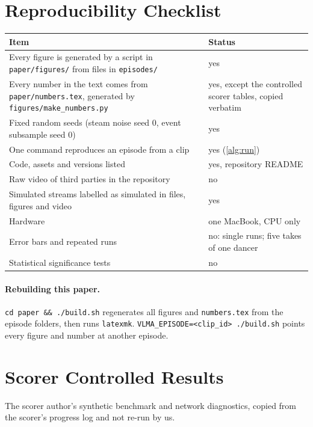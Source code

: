 \documentclass[10pt]{article}
\newcommand{\file}[1]{\texttt{#1}}
\begin{document}
\clearpage
\appendix
\section{Reproducibility Checklist}
\label{app:repro}

\begin{small}
\begin{tabularx}{\linewidth}{@{}>{\raggedright\arraybackslash}X >{\raggedright\arraybackslash}p{5.2cm}@{}}
\toprule
Item & Status \\
\midrule
Every figure is generated by a script in \file{paper/figures/} from files in \file{episodes/} & yes \\
Every number in the text comes from \file{paper/numbers.tex}, generated by \file{figures/make\_numbers.py} & yes, except the controlled scorer tables, copied verbatim \\
Fixed random seeds (steam noise seed 0, event subsample seed 0) & yes \\
One command reproduces an episode from a clip & yes (\cref{alg:run}) \\
Code, assets and versions listed & yes, repository README \\
Raw video of third parties in the repository & no \\
Simulated streams labelled as simulated in files, figures and video & yes \\
Hardware & one MacBook, CPU only \\
Error bars and repeated runs & no: single runs; five takes of one dancer \\
Statistical significance tests & no \\
\bottomrule
\end{tabularx}
\end{small}

\paragraph{Rebuilding this paper.} \texttt{cd paper \&\& ./build.sh} regenerates all figures and \file{numbers.tex} from the episode folders, then runs \texttt{latexmk}. \texttt{VLMA\_EPISODE=<clip\_id> ./build.sh} points every figure and number at another episode.

\section{Scorer Controlled Results}
\label{app:scorer}

The scorer author's synthetic benchmark and network diagnostics, copied from the scorer's progress log and not re-run by us.
\end{document}
